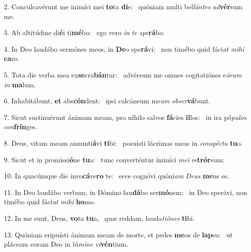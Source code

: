 2. Conculcavérunt me inimíci mei \textbf{to}ta \textbf{di}e: \ast\  quóniam multi bel\textit{lán}\textit{tes} \textit{ad}\textbf{vér}sum me.\

3. Ab altitúdine di\textbf{é}i ti\textbf{mé}bo: \ast\  ego vero \textit{in} \textit{te} \textit{spe}\textbf{rá}bo.\

4. In Deo laudábo sermónes meos, in \textbf{De}o spe\textbf{rá}vi: \ast\  non timébo quid fáci\textit{at} \textit{mi}\textit{hi} \textbf{ca}ro.\

5. Tota die verba mea ex\textbf{se}cra\textbf{bán}tur: \ast\  advérsum me omnes cogitatiónes e\textit{ó}\textit{rum} \textit{in} \textbf{ma}lum.\

6. Inhabitábunt, \textbf{et} abs\textbf{cón}dent: \ast\  ipsi calcáneum me\textit{um} \textit{ob}\textit{ser}\textbf{vá}bunt.\

7. Sicut sustinuérunt ánimam meam, pro níhilo salvos \textbf{fá}cies \textbf{il}los: \ast\  in ira pó\textit{pu}\textit{los} \textit{con}\textbf{frín}ges.\

8. Deus, vitam meam annunti\textbf{á}vi \textbf{ti}bi: \ast\  posuísti lácrimas meas in \textit{con}\textit{spéc}\textit{tu} \textbf{tu}o.\

9. Sicut et in promissi\textbf{ó}ne \textbf{tu}a: \ast\  tunc converténtur inimíci \textit{me}\textit{i} \textit{re}\textbf{trór}sum:\

10. In quacúmque die invo\textbf{cá}ve\textbf{ro} te: \ast\  ecce cognóvi quóni\textit{am} \textit{De}\textit{us} \textbf{me}us es.\

11. In Deo laudábo verbum, in Dómino lau\textbf{dá}bo ser\textbf{mó}nem: \ast\  in Deo sperávi, non timébo quid fáci\textit{at} \textit{mi}\textit{hi} \textbf{ho}mo.\

12. In me sunt, Deus, \textbf{vo}ta \textbf{tu}a, \ast\  quæ reddam, lauda\textit{ti}\textit{ó}\textit{nes} \textbf{ti}bi.\

13. Quóniam eripuísti ánimam meam de morte, et pedes \textbf{me}os de \textbf{lap}su: \ast\  ut pláceam coram Deo in lú\textit{mi}\textit{ne} \textit{vi}\textbf{vén}tium.\

